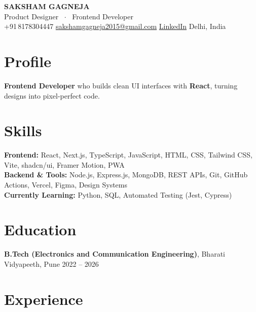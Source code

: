 \documentclass[10pt,a4paper]{article}
\newcounter{tl}
\begin{document}

\begin{center}
  {\LARGE\bfseries\color{accent} SAKSHAM GAGNEJA}\\[4pt]
  {\small\textcolor{midgrey}{Product Designer \ $\cdot$ \ Frontend Developer}}\\[3pt]
  {\small
    +91\,8178304447 \quad
    \href{mailto:sakshamgagneja2015@gmail.com}{sakshamgagneja2015@gmail.com} \quad
    \href{https://www.linkedin.com/in/saksham-gagneja-2665a124a}{LinkedIn} \quad
    Delhi, India
  }
\end{center}

\vspace{2pt}

\section{Profile}
\textbf{Frontend Developer} who builds clean UI interfaces with \textbf{React}, turning designs into pixel-perfect code.

\section{Skills}
\textbf{Frontend:} React, Next.js, TypeScript, JavaScript, HTML, CSS, Tailwind CSS, Vite, shadcn/ui, Framer Motion, PWA\\[1pt]
\textbf{Backend \& Tools:} Node.js, Express.js, MongoDB, REST APIs, Git, GitHub Actions, Vercel, Figma, Design Systems\\[1pt]
\textbf{Currently Learning:} Python, SQL, Automated Testing (Jest, Cypress)

\section{Education}
\textbf{B.Tech (Electronics and Communication Engineering)},
Bharati Vidyapeeth, Pune \hfill 2022 -- 2026

\section{Experience}
\end{document}
